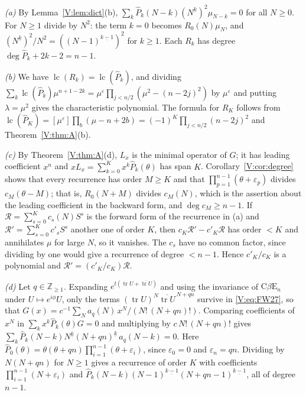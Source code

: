 \documentclass[11pt,a4paper]{article}
\theoremstyle{definition}
\theoremstyle{remark}
\newcommand{\Z}{\mathbb Z}
\newcommand{\ff}[2]{#1^{\underline{#2}}}
\DeclareMathOperator{\lc}{lc}
\DeclareMathOperator{\tr}{tr}
\numberwithin{equation}{section}
\begin{document}
\emph{(a)} By Lemma~\ref{V:lem:dict}(b), $\sum_{k}\hat P_k(N-k)(\ff Nk)^2\mu_{N-k}=0$ for all $N\ge0$. For $N\ge1$ divide by $N^2$: the term $k=0$ becomes $R_0(N)\mu_N$, and $(\ff Nk)^2/N^2=(\ff{(N-1)}{k-1})^2$ for $k\ge1$. Each $R_k$ has degree $\deg\hat P_k+2k-2=n-1$.

\emph{(b)} We have $\lc(R_k)=\lc(\hat P_k)$, and dividing $\sum_k\lc(\hat P_k)\mu^{n+1-2k}=\mu^{\varepsilon}\prod_{j<n/2}(\mu^2-(n-2j)^2)$ by $\mu^\varepsilon$ and putting $\lambda=\mu^2$ gives the characteristic polynomial. The formula for $R_K$ follows from $\lc(\hat P_K)=[\mu^\varepsilon]\prod_b(\mu-n+2b)=(-1)^K\prod_{j<n/2}(n-2j)^2$ and Theorem~\ref{V:thm:A}(b).

\emph{(c)} By Theorem~\ref{V:thm:A}(d), $L_x$ is the minimal operator of $G$; it has leading coefficient $x^n$ and $xL_x=\sum_{k=0}^{K}x^k\hat P_k(\theta)$ has span $K$. Corollary~\ref{V:cor:degree} shows that every recurrence has order $M\ge K$ and that $\prod_{p=1}^{n-1}(\theta+\varepsilon_p)$ divides $c_M(\theta-M)$; that is, $R_0(N+M)$ divides $c_M(N)$, which is the assertion about the leading coefficient in the backward form, and $\deg c_M\ge n-1$. If $\mathcal R=\sum_{s=0}^Kc_s(N)S^s$ is the forward form of the recurrence in (a) and $\mathcal R'=\sum_{s=0}^Kc'_sS^s$ another one of order $K$, then $c_K\mathcal R'-c'_K\mathcal R$ has order $<K$ and annihilates $\mu$ for large $N$, so it vanishes. The $c_s$ have no common factor, since dividing by one would give a recurrence of degree $<n-1$. Hence $c'_K/c_K$ is a polynomial and $\mathcal R'=(c'_K/c_K)\mathcal R$.

\emph{(d)} Let $q\in\Z_{\ge1}$. Expanding $e^{t(\tr U+\overline{\tr U})}$ and using the invariance of $\mathrm{C}\beta\mathrm{E}_n$ under $U\mapsto e^{i\phi}U$, only the terms $(\tr U)^N\overline{\tr U}^{\,N+qn}$ survive in \eqref{V:eq:FW27}, so that $G(x)=c^{-1}\sum_Na_q(N)\,x^N/(N!\,(N+qn)!)$. Comparing coefficients of $x^N$ in $\sum_kx^k\hat P_k(\theta)G=0$ and multiplying by $c\,N!\,(N+qn)!$ gives $\sum_k\hat P_k(N-k)\ff Nk\ff{(N+qn)}k\,a_q(N-k)=0$. Here $\hat P_0(\theta)=\theta(\theta+qn)\prod_{i=1}^{n-1}(\theta+\varepsilon_i)$, since $\varepsilon_0=0$ and $\varepsilon_n=qn$. Dividing by $N(N+qn)$ for $N\ge1$ gives a recurrence of order $K$ with coefficients $\prod_{i=1}^{n-1}(N+\varepsilon_i)$ and $\hat P_k(N-k)\ff{(N-1)}{k-1}\ff{(N+qn-1)}{k-1}$, all of degree $n-1$.
\end{document}
